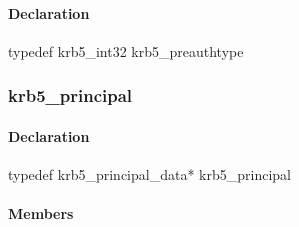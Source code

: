 \documentclass[letterpaper,10pt,english]{sphinxmanual}
\begin{document}
\begin{fulllineitems}
\label{appdev/refs/types/krb5_preauthtype:c.krb5_preauthtype}
\end{fulllineitems}



\paragraph{Declaration}
\label{appdev/refs/types/krb5_preauthtype:declaration}
typedef krb5\_int32 krb5\_preauthtype


\subsubsection{krb5\_principal}
\label{appdev/refs/types/krb5_principal:krb5-principal-struct}\label{appdev/refs/types/krb5_principal:krb5-principal}\label{appdev/refs/types/krb5_principal::doc}

\begin{fulllineitems}
\label{appdev/refs/types/krb5_principal:c.krb5_principal}
\end{fulllineitems}



\paragraph{Declaration}
\label{appdev/refs/types/krb5_principal:declaration}
typedef krb5\_principal\_data* krb5\_principal


\paragraph{Members}
\label{appdev/refs/types/krb5_principal:members}

\begin{fulllineitems}
\label{appdev/refs/types/krb5_principal:c.krb5_principal.magic}
\end{fulllineitems}


\begin{fulllineitems}
\label{appdev/refs/types/krb5_principal:c.krb5_principal.realm}
\end{fulllineitems}
\end{document}
